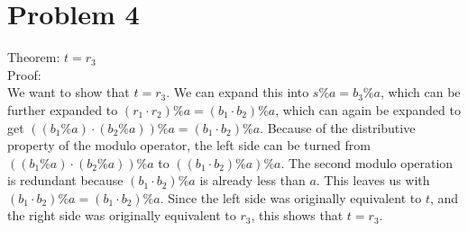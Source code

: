 \documentclass{article}
\begin{document}
\section*{Problem 4}
Theorem: $t=r_3$\\
Proof:\\
We want to show that $t=r_3$. We can expand this into $s\%a=b_3\%a$, which can be further expanded to $(r_1\cdot r_2)\%a=(b_1\cdot b_2)\% a$, which can again be expanded to get $((b_1\% a)\cdot (b_2 \% a))\%a=(b_1\cdot b_2)\% a$. Because of the distributive property of the modulo operator, the left side can be turned from $((b_1\% a)\cdot (b_2 \% a))\%a$ to $((b_1\cdot b_2)\% a)\%a$. The second modulo operation is redundant because  $(b_1\cdot b_2)\% a$ is already less than $a$. This leaves us with $(b_1\cdot b_2)\% a=(b_1\cdot b_2)\% a$. Since the left side was originally equivalent to $t$, and the right side was originally equivalent to $r_3$, this shows that $t=r_3$.
\end{document}
